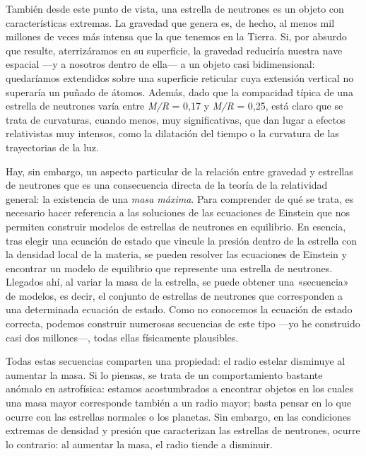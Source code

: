 También desde este punto de vista, una estrella de neutrones es un objeto con características extremas. La gravedad que genera es, de hecho, al menos mil millones de veces más intensa que la que tenemos en la Tierra. Si, por absurdo que resulte, aterrizáramos en su superficie, la gravedad reduciría nuestra nave espacial ---y a nosotros dentro de ella--- a un objeto casi bidimensional: quedaríamos extendidos sobre una superficie reticular cuya extensión vertical no superaría un puñado de átomos. Además, dado que la compacidad típica de una estrella de neutrones varía entre \emph{M/R} = 0,17 y \emph{M/R} = 0,25, está claro que se trata de curvaturas, cuando menos, muy significativas, que dan lugar a efectos relativistas muy intensos, como la dilatación del tiempo o la curvatura de las trayectorias de la luz.

Hay, sin embargo, un aspecto particular de la relación entre gravedad y estrellas de neutrones que es una consecuencia directa de la teoría de la relatividad general: la existencia de una \emph{masa máxima}. Para comprender de qué se trata, es necesario hacer referencia a las soluciones de las ecuaciones de Einstein que nos permiten construir modelos de estrellas de neutrones en equilibrio. En esencia, tras elegir una ecuación de estado que vincule la presión dentro de la estrella con la densidad local de la materia, se pueden resolver las ecuaciones de Einstein y encontrar un modelo de equilibrio que represente una estrella de neutrones. Llegados ahí, al variar la masa de la estrella, se puede obtener una «secuencia» de modelos, es decir, el conjunto de estrellas de neutrones que corresponden a una determinada ecuación de estado. Como no conocemos la ecuación de estado correcta, podemos construir numerosas secuencias de este tipo ---yo he construido casi dos millones---, todas ellas físicamente plausibles.

Todas estas secuencias comparten una propiedad: el radio estelar disminuye al aumentar la masa. Si lo piensas, se trata de un comportamiento bastante anómalo en astrofísica: estamos acostumbrados a encontrar objetos en los cuales una masa mayor corresponde también a un radio mayor; basta pensar en lo que ocurre con las estrellas normales o los planetas. Sin embargo, en las condiciones extremas de densidad y presión que caracterizan las estrellas de neutrones, ocurre lo contrario: al aumentar la masa, el radio tiende a disminuir.

